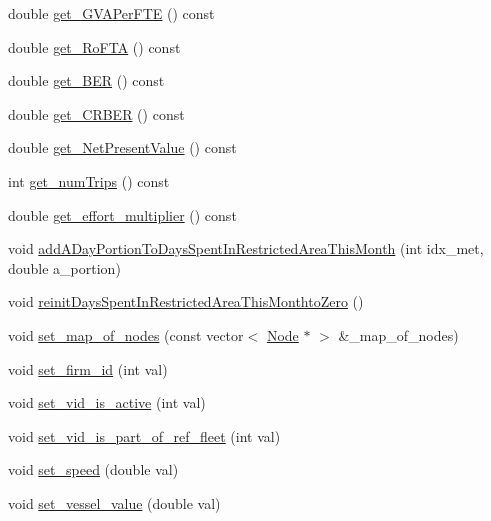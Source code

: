 \begin{DoxyCompactItemize}
\item 
double \mbox{\hyperlink{class_vessel_aebc024ff52aff398f1c95fd148ef1f90}{get\+\_\+\+G\+V\+A\+Per\+F\+TE}} () const
\item 
double \mbox{\hyperlink{class_vessel_af7f09d52d3945e210feea4951af5758b}{get\+\_\+\+Ro\+F\+TA}} () const
\item 
double \mbox{\hyperlink{class_vessel_ac8ae65328d4b7f44cf4db93d038dece6}{get\+\_\+\+B\+ER}} () const
\item 
double \mbox{\hyperlink{class_vessel_ae305092f9f0d5a19116a96d7a246e393}{get\+\_\+\+C\+R\+B\+ER}} () const
\item 
double \mbox{\hyperlink{class_vessel_af69f57aa1be4a204b4da4082cc3425a7}{get\+\_\+\+Net\+Present\+Value}} () const
\item 
int \mbox{\hyperlink{class_vessel_a34179609180708e8e1b11460ac14bca0}{get\+\_\+num\+Trips}} () const
\item 
double \mbox{\hyperlink{class_vessel_a7539c706097302bcb0c4eff59c5f656d}{get\+\_\+effort\+\_\+multiplier}} () const
\item 
void \mbox{\hyperlink{class_vessel_a9e28d87f5d2678c3c792e1317806284d}{add\+A\+Day\+Portion\+To\+Days\+Spent\+In\+Restricted\+Area\+This\+Month}} (int idx\+\_\+met, double a\+\_\+portion)
\item 
void \mbox{\hyperlink{class_vessel_a92e3c0d99cec3326a562eb4b0e89ff4a}{reinit\+Days\+Spent\+In\+Restricted\+Area\+This\+Monthto\+Zero}} ()
\item 
void \mbox{\hyperlink{class_vessel_aca8d7c0707ac3c5ee73f55ffab536af3}{set\+\_\+map\+\_\+of\+\_\+nodes}} (const vector$<$ \mbox{\hyperlink{class_node}{Node}} $\ast$ $>$ \&\+\_\+map\+\_\+of\+\_\+nodes)
\item 
void \mbox{\hyperlink{class_vessel_ab08e5d4629d18a4e9234606a65679e11}{set\+\_\+firm\+\_\+id}} (int val)
\item 
void \mbox{\hyperlink{class_vessel_add4af3b90980d297a8a12b9560e6cbac}{set\+\_\+vid\+\_\+is\+\_\+active}} (int val)
\item 
void \mbox{\hyperlink{class_vessel_a85fe8be9658037a5c232ab34b1ed28c2}{set\+\_\+vid\+\_\+is\+\_\+part\+\_\+of\+\_\+ref\+\_\+fleet}} (int val)
\item 
void \mbox{\hyperlink{class_vessel_a949058866a911471a2d38e1f6dbb233c}{set\+\_\+speed}} (double val)
\item 
void \mbox{\hyperlink{class_vessel_a5b311a198f492237f5ae56c7b9d9d1c1}{set\+\_\+vessel\+\_\+value}} (double val)
\item 

\end{DoxyCompactItemize}
